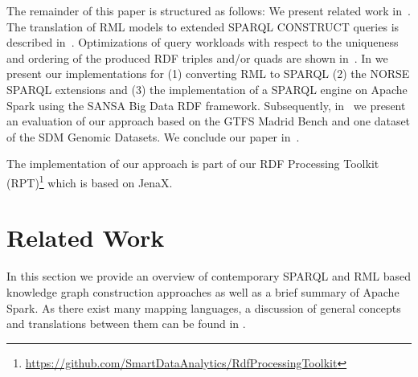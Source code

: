 The remainder of this paper is structured as follows:
We present related work
in~.
The translation of RML models to extended SPARQL CONSTRUCT queries is described in~.
Optimizations of query workloads with respect to the uniqueness and ordering of the produced RDF triples and/or quads are shown in~.
In  we present our implementations for (1) converting RML to SPARQL (2) the NORSE SPARQL extensions
and (3) the implementation of a SPARQL engine on Apache Spark using the SANSA Big Data RDF framework.
Subsequently, in~ we present an evaluation of our approach based on the GTFS Madrid Bench and one dataset of the SDM Genomic Datasets.
We conclude our paper in~.

The implementation of our approach is part of our RDF Processing Toolkit (RPT)\footnote{\url{https://github.com/SmartDataAnalytics/RdfProcessingToolkit}} which is based on JenaX.


\section{Related Work}
\label{sec:related-work}
In this section we provide an overview of contemporary SPARQL and RML based knowledge graph construction approaches 
as well as a brief summary of Apache Spark.
As there exist many mapping languages\cite{Meester2019, ChavesFraga2021, IglesiasMolina2022a, Assche2023}, a discussion of general concepts and translations between them can be found in \cite{Corcho2020, IglesiasMolina2022}.



